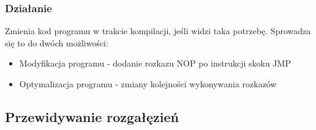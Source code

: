    		\subsubsection{Działanie}
   			Zmienia kod programu w trakcie kompilacji, jeśli widzi taka potrzebę. Sprowadza się to do dwóch możliwości:
		   	\begin{itemize}
		   		\item Modyfikacja programu - dodanie rozkazu NOP po instrukcji skoku JMP
		   		\item Optymalizacja programu - zmiany kolejności wykonywania rozkazów
		   	\end{itemize}
   	\subsection{Przewidywanie rozgałęzień}
